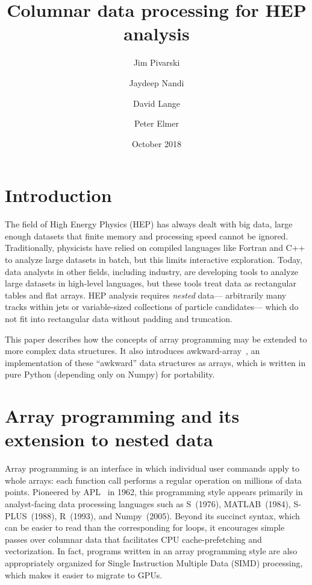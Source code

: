 \documentclass{webofc}
\title{Columnar data processing for HEP analysis}
\author{Jim Pivarski\inst{1} \and Jaydeep Nandi\inst{2} \and David Lange\inst{1} \and Peter Elmer\inst{1}}
\date{October 2018}
\begin{document}

\maketitle

\section{Introduction}

The field of High Energy Physics (HEP) has always dealt with big data, large enough datasets that finite memory and processing speed cannot be ignored. Traditionally, physicists have relied on compiled languages like Fortran and C++ to analyze large datasets in batch, but this limits interactive exploration. Today, data analysts in other fields, including industry, are developing tools to analyze large datasets in high-level languages, but these tools treat data as rectangular tables and flat arrays. HEP analysis requires {\it nested} data--- arbitrarily many tracks within jets or variable-sized collections of particle candidates--- which do not fit into rectangular data without padding and truncation.

This paper describes how the concepts of array programming may be extended to more complex data structures. It also introduces awkward-array~\cite{awkward}, an implementation of these ``awkward'' data structures as arrays, which is written in pure Python (depending only on Numpy) for portability.

\section{Array programming and its extension to nested data}

Array programming is an interface in which individual user commands apply to whole arrays: each function call performs a regular operation on millions of data points. Pioneered by APL~\cite{apl} in 1962, this programming style appears primarily in analyst-facing data processing languages such as S~(1976), MATLAB~(1984), S-PLUS~(1988), R~(1993), and Numpy~(2005). Beyond its succinct syntax, which can be easier to read than the corresponding for loops, it encourages simple passes over columnar data that facilitates CPU cache-prefetching and vectorization. In fact, programs written in an array programming style are also appropriately organized for Single Instruction Multiple Data (SIMD) processing, which makes it easier to migrate to GPUs.
\end{document}
